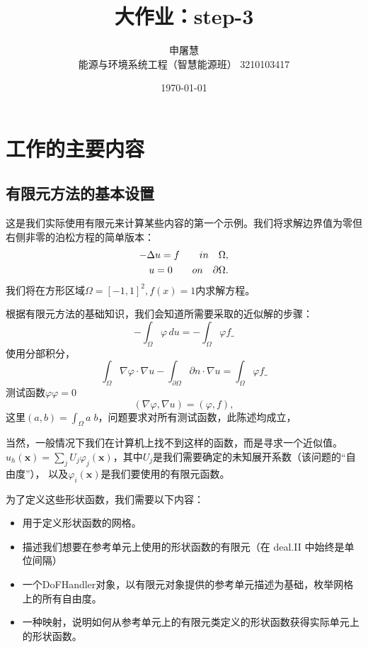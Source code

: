 \documentclass{ctexart}
\title{大作业：step-3}
\author{申屠慧 \\ 能源与环境系统工程（智慧能源班） 3210103417}
\date{\today}
\begin{document}
\maketitle

\section{工作的主要内容}
\subsection{有限元方法的基本设置}
这是我们实际使用有限元来计算某些内容的第一个示例。我们将求解边界值为零但右侧非零的泊松方程的简单版本：
\begin{align*}
    -\Delta u = f \quad \quad in \quad \Omega, \\
    u = 0  \quad \quad on \quad \partial \Omega. \notag
\end{align*}
我们将在方形区域$ \Omega = [-1,1]^2 , f(x) = 1 $内求解方程。

根据有限元方法的基础知识，我们会知道所需要采取的近似解的步骤：
\begin{equation*}
    -\int_{\Omega} \varphi \,du = -\int_{\Omega} \varphi f \text{\_}
\end{equation*}
使用分部积分，
\begin{equation*}
    \int_{\Omega} \nabla \varphi \cdot \nabla u - \int_{\partial \Omega} \partial n \cdot \nabla u = \int_{\Omega} \varphi f \text{\_} 
\end{equation*}
测试函数$\varphi \varphi = 0 $
\begin{equation*}
    (\nabla \varphi , \nabla u) = (\varphi , f),
\end{equation*}
这里\((a,b)=\int_\Omega a\; b\)，问题要求对所有测试函数，此陈述均成立，

当然，一般情况下我们在计算机上找不到这样的函数，而是寻求一个近似值。
\(u_h(\mathbf x)=\sum_j U_j \varphi_j(\mathbf x)\)，其中$ U_j $是我们需要确定的未知展开系数（该问题的“自由度”），
以及\(\varphi_i(\mathbf x)\)是我们要使用的有限元函数。 

为了定义这些形状函数，我们需要以下内容：
\begin{itemize}
    \item 用于定义形状函数的网格。
    \item 描述我们想要在参考单元上使用的形状函数的有限元（在 deal.II 中始终是单位间隔）
    \item 一个DoFHandler对象，以有限元对象提供的参考单元描述为基础，枚举网格上的所有自由度。
    \item 一种映射，说明如何从参考单元上的有限元类定义的形状函数获得实际单元上的形状函数。
\end{itemize}
\end{document}
